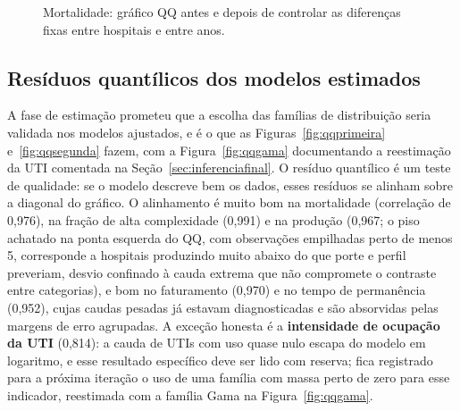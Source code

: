 \begin{figure}[H]
\centering
{}
\caption{Mortalidade: gráfico QQ antes e depois de controlar as
diferenças fixas entre hospitais e entre anos.}
\label{fig:qqcondC}
\end{figure}


\newpage
\subsection*{Resíduos quantílicos dos modelos estimados}

A fase de estimação prometeu que a escolha das famílias de distribuição
seria validada nos modelos ajustados, e é o que as
Figuras~\ref{fig:qqprimeira} e~\ref{fig:qqsegunda} fazem, com a
Figura~\ref{fig:qqgama} documentando a reestimação da UTI comentada na
Seção~\ref{sec:inferenciafinal}. O resíduo quantílico é um teste de
qualidade: se o modelo descreve bem os dados, esses resíduos se alinham
sobre a diagonal do gráfico. O alinhamento é muito bom na mortalidade
(correlação de 0,976), na fração de alta complexidade (0,991) e na
produção (0,967; o piso achatado na ponta esquerda do QQ, com
observações empilhadas perto de menos 5, corresponde a hospitais
produzindo muito abaixo do que porte e perfil preveriam, desvio
confinado à cauda extrema que não compromete o contraste entre
categorias), e bom no faturamento (0,970) e no tempo de permanência
(0,952), cujas caudas pesadas já estavam diagnosticadas e são absorvidas
pelas margens de erro agrupadas. A exceção honesta é a
\textbf{intensidade de ocupação da UTI} (0,814): a cauda de UTIs com uso
quase nulo escapa do modelo em logaritmo, e esse resultado específico
deve ser lido com reserva; fica registrado para a próxima iteração o uso
de uma família com massa perto de zero para esse indicador, reestimada
com a família Gama na Figura~\ref{fig:qqgama}.


